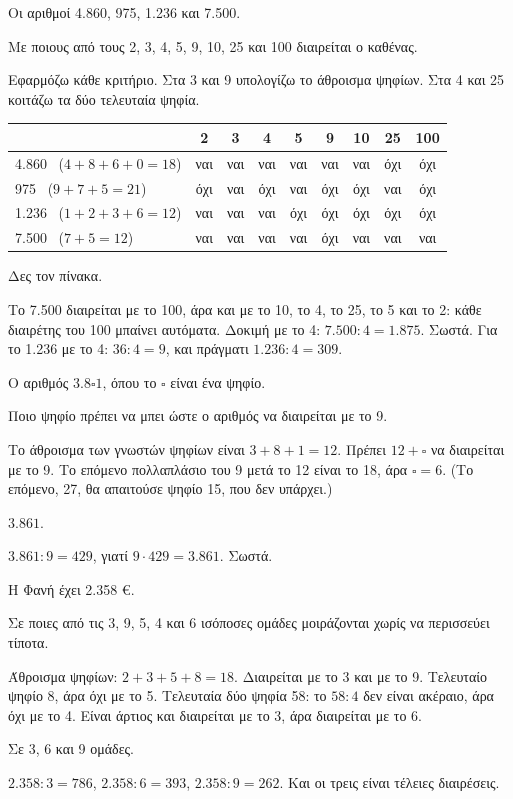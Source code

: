 
\tixero Οι αριθμοί 4.860, 975, 1.236 και 7.500.\par
\tithelo Με ποιους από τους 2, 3, 4, 5, 9, 10, 25 και 100 διαιρείται ο καθένας.\par
\possindeo Εφαρμόζω κάθε κριτήριο. Στα 3 και 9 υπολογίζω το άθροισμα ψηφίων. Στα 4 και 25 κοιτάζω τα δύο τελευταία ψηφία.

\begin{center}
\small\renewcommand{\arraystretch}{1.3}\setlength{\tabcolsep}{4pt}
\begin{tabular}{@{}lcccccccc@{}}
\toprule
 & 2 & 3 & 4 & 5 & 9 & 10 & 25 & 100\\
\midrule
4.860 \ ($4+8+6+0=18$) & ναι & ναι & ναι & ναι & ναι & ναι & όχι & όχι\\
975 \ ($9+7+5=21$) & όχι & ναι & όχι & ναι & όχι & όχι & ναι & όχι\\
1.236 \ ($1+2+3+6=12$) & ναι & ναι & ναι & όχι & όχι & όχι & όχι & όχι\\
7.500 \ ($7+5=12$) & ναι & ναι & ναι & ναι & όχι & ναι & ναι & ναι\\
\bottomrule
\end{tabular}
\end{center}

\apantisi Δες τον πίνακα.\par
\elegxos Το 7.500 διαιρείται με το 100, άρα και με το 10, το 4, το 25, το 5 και το 2: κάθε διαιρέτης του 100 μπαίνει αυτόματα. Δοκιμή με το 4: $7.500:4=1.875$. Σωστά. Για το 1.236 με το 4: $36:4=9$, και πράγματι $1.236:4=309$.

\tixero Ο αριθμός $3.8\square 1$, όπου το $\square$ είναι ένα ψηφίο.\par
\tithelo Ποιο ψηφίο πρέπει να μπει ώστε ο αριθμός να διαιρείται με το 9.\par
\possindeo Το άθροισμα των γνωστών ψηφίων είναι $3+8+1=12$. Πρέπει $12+\square$ να διαιρείται με το 9. Το επόμενο πολλαπλάσιο του 9 μετά το 12 είναι το 18, άρα $\square=6$. (Το επόμενο, 27, θα απαιτούσε ψηφίο 15, που δεν υπάρχει.)\par
\apantisi $3.861$.\par
\elegxos $3.861:9=429$, γιατί $9\cdot 429=3.861$. Σωστά.

\tixero Η Φανή έχει 2.358 €.\par
\tithelo Σε ποιες από τις 3, 9, 5, 4 και 6 ισόποσες ομάδες μοιράζονται χωρίς να περισσεύει τίποτα.\par
\possindeo Άθροισμα ψηφίων: $2+3+5+8=18$. Διαιρείται με το 3 και με το 9. Τελευταίο ψηφίο 8, άρα όχι με το 5. Τελευταία δύο ψηφία 58: το $58:4$ δεν είναι ακέραιο, άρα όχι με το 4. Είναι άρτιος και διαιρείται με το 3, άρα διαιρείται με το 6.\par
\apantisi Σε 3, 6 και 9 ομάδες.\par
\elegxos $2.358:3=786$, $2.358:6=393$, $2.358:9=262$. Και οι τρεις είναι τέλειες διαιρέσεις.

